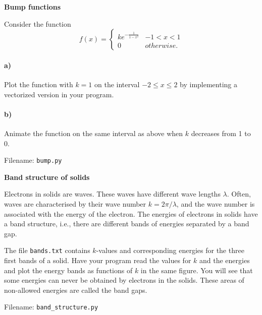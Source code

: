 \begin{Problem}{\textbf{Bump functions}}

\noindent Consider the function
\begin{equation*}
   f(x)=\begin{cases}
       ke^{-\frac{1}{1-x^2}} & -1 < x < 1 \\
       0 & otherwise.
   \end{cases}
\end{equation*}

\paragraph{a)}
Plot the function with $k=1$ on the interval $-2 \leq x \leq 2$ by implementing
a vectorized version in your program.

\paragraph{b)}
Animate the function on the same interval as above when $k$ decreases from
1 to 0.

Filename: \texttt{bump.py}
\end{Problem}

\begin{Problem}{\textbf{Band structure of solids}}

\noindent Electrons in solids are waves. These waves have different wave lengths $\lambda$.
Often, waves are characterised by their wave number $k = 2\pi/\lambda$, and the
wave number is associated with the energy of the electron. The energies of electrons
in solids have a band structure, i.e., there are different bands of energies
separated by a band gap.

The file \texttt{bands.txt} contains $k$-values and corresponding energies for
the three first bands of a solid. Have your program read the values for $k$ and
the energies and plot the energy bands as functions of $k$ in the same figure.
You will see that some energies can never be obtained by electrons in the solids.
These areas of non-allowed energies are called the band gaps.

Filename: \texttt{band\_structure.py}
\end{Problem}


